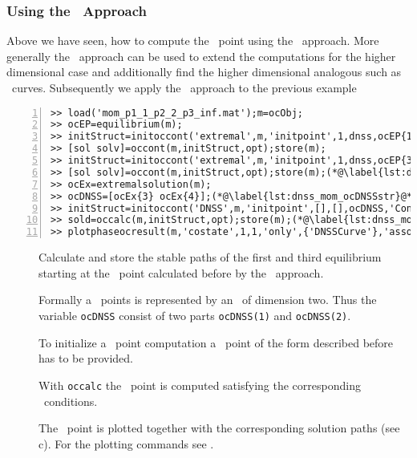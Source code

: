 \subsubsection{Using the \BVP\ Approach}
Above we have seen, how to compute the \DNSP\ point using the \IVP\ approach. More generally the \BVP\ approach can be used to extend the computations for the higher dimensional case and additionally find the higher dimensional analogous such as \DNSP\ curves. Subsequently we apply the \BVP\ approach to the previous example
\begin{lstlisting}[numbers=left]
>> load('mom_p1_1_p2_2_p3_inf.mat');m=ocObj;
>> ocEP=equilibrium(m);
>> initStruct=initoccont('extremal',m,'initpoint',1,dnss,ocEP{1},'ContinuationType','f','IntegrationTime',1000);(*@\label{lst:dnss_mom_initoccont1}@*)
>> [sol solv]=occont(m,initStruct,opt);store(m);
>> initStruct=initoccont('extremal',m,'initpoint',1,dnss,ocEP{3},'ContinuationType','f','IntegrationTime',1000);
>> [sol solv]=occont(m,initStruct,opt);store(m);(*@\label{lst:dnss_mom_initoccont2}@*)
>> ocEx=extremalsolution(m);
>> ocDNSS=[ocEx{3} ocEx{4}];(*@\label{lst:dnss_mom_ocDNSSstr}@*)
>> initStruct=initoccont('DNSS',m,'initpoint',[],[],ocDNSS,'ContinuationType','f');(*@\label{lst:dnss_mom_initoccontdnss}@*)
>> sold=occalc(m,initStruct,opt);store(m);(*@\label{lst:dnss_mom_occalc}@*)
>> plotphaseocresult(m,'costate',1,1,'only',{'DNSSCurve'},'associatedsol','on')(*@\label{lst:dnss_mom_plotphaseocresult}@*)
\end{lstlisting}
\begin{description}
	\item[] Calculate and store the stable paths of the first and third equilibrium starting at the \DNSP\ point calculated before by the \IVP\ approach.
	\item[] Formally a \DNSP\ points is represented by an \ocasymptotic\ of dimension two. Thus the variable \lstinline+ocDNSS+ consist of two parts \lstinline+ocDNSS(1)+ and \lstinline+ocDNSS(2)+.
	\item[] To initialize a \DNSP\ point computation a \DNSP\ point of the form described before has to be provided.
	\item[] With \lstinline+occalc+ the \DNSP\ point is computed satisfying the corresponding \BVP\ conditions. 
	\item[] The \DNSP\ point is plotted together with the corresponding solution paths (see c). For the plotting commands see .
\end{description}
